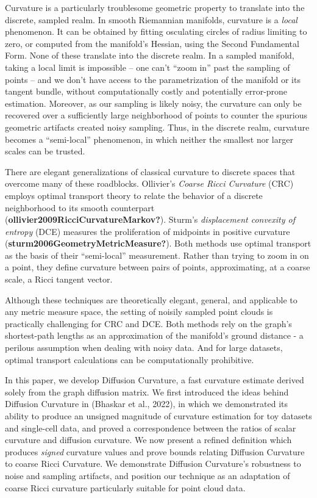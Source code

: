 \documentclass[
]{agujournal2019}
\begin{document}
Curvature is a particularly troublesome geometric property to translate
into the discrete, sampled realm. In smooth Riemannian manifolds,
curvature is a \emph{local} phenomenon. It can be obtained by fitting
osculating circles of radius limiting to zero, or computed from the
manifold's Hessian, using the Second Fundamental Form. None of these
translate into the discrete realm. In a sampled manifold, taking a local
limit is impossible -- one can't ``zoom in'' past the sampling of points
-- and we don't have access to the parametrization of the manifold or
its tangent bundle, without computationally costly and potentially
error-prone estimation. Moreover, as our sampling is likely noisy, the
curvature can only be recovered over a sufficiently large neighborhood
of points to counter the spurious geometric artifacts created noisy
sampling. Thus, in the discrete realm, curvature becomes a
``semi-local'' phenomenon, in which neither the smallest nor larger
scales can be trusted.

There are elegant generalizations of classical curvature to discrete
spaces that overcome many of these roadblocks. Ollivier's \emph{Coarse
Ricci Curvature} (CRC) employs optimal transport theory to relate the
behavior of a discrete neighborhood to its smooth counterpart
(\textbf{ollivier2009RicciCurvatureMarkov?}). Sturm's \emph{displacement
convexity of entropy} (DCE) measures the proliferation of midpoints in
positive curvature (\textbf{sturm2006GeometryMetricMeasure?}). Both
methods use optimal transport as the basis of their ``semi-local''
measurement. Rather than trying to zoom in on a point, they define
curvature between pairs of points, approximating, at a coarse scale, a
Ricci tangent vector.

Although these techniques are theoretically elegant, general, and
applicable to any metric measure space, the setting of noisily sampled
point clouds is practically challenging for CRC and DCE. Both methods
rely on the graph's shortest-path lengths as an approximation of the
manifold's ground distance - a perilous assumption when dealing with
noisy data. And for large datasets, optimal transport calculations can
be computationally prohibitive.

In this paper, we develop Diffusion Curvature, a fast curvature estimate
derived solely from the graph diffusion matrix. We first introduced the
ideas behind Diffusion Curvature in (Bhaskar et al., 2022), in which we
demonstrated its ability to produce an unsigned magnitude of curvature
estimation for toy datasets and single-cell data, and proved a
correspondence between the ratios of scalar curvature and diffusion
curvature. We now present a refined definition which produces
\emph{signed} curvature values and prove bounds relating Diffusion
Curvature to coarse Ricci Curvature. We demonstrate Diffusion
Curvature's robustness to noise and sampling artifacts, and position our
technique as an adaptation of coarse Ricci curvature particularly
suitable for point cloud data.
\end{document}
